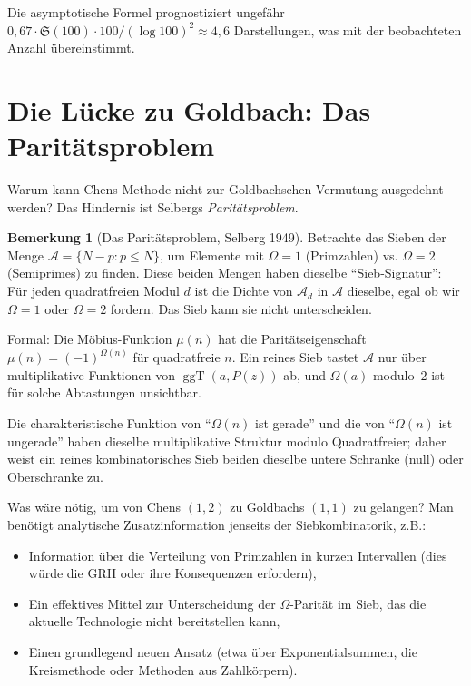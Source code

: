 \documentclass[12pt,a4paper]{amsart}
\theoremstyle{definition}
\newtheorem{bemerkung}[theorem]{Bemerkung}
\DeclareMathOperator{\ggT}{ggT}
\newcommand{\OOmega}{\Omega}
\begin{document}
Die asymptotische Formel prognostiziert ungefähr
$0{,}67 \cdot \mathfrak{S}(100) \cdot 100/(\log 100)^2 \approx 4{,}6$
Darstellungen, was mit der beobachteten Anzahl übereinstimmt.

\section{Die Lücke zu Goldbach: Das Paritätsproblem}\label{sec:paritaet}

Warum kann Chens Methode nicht zur Goldbachschen Vermutung ausgedehnt werden?
Das Hindernis ist Selbergs \emph{Paritätsproblem}.

\begin{bemerkung}[Das Paritätsproblem, Selberg 1949]
  Betrachte das Sieben der Menge $\mathcal{A} = \{N - p : p \leq N\}$,
  um Elemente mit $\OOmega = 1$ (Primzahlen) vs. $\OOmega = 2$ (Semiprimes)
  zu finden.  Diese beiden Mengen haben dieselbe ``Sieb-Signatur'': Für
  jeden quadratfreien Modul $d$ ist die Dichte von $\mathcal{A}_d$ in
  $\mathcal{A}$ dieselbe, egal ob wir $\OOmega = 1$ oder $\OOmega = 2$
  fordern.  Das Sieb kann sie nicht unterscheiden.

  Formal: Die Möbius-Funktion $\mu(n)$ hat die Paritätseigenschaft
  $\mu(n) = (-1)^{\OOmega(n)}$ für quadratfreie $n$.  Ein reines Sieb
  tastet $\mathcal{A}$ nur über multiplikative Funktionen von
  $\ggT(a, P(z))$ ab, und $\OOmega(a)$ modulo~$2$ ist für solche
  Abtastungen unsichtbar.

  Die charakteristische Funktion von ``$\OOmega(n)$ ist gerade'' und die
  von ``$\OOmega(n)$ ist ungerade'' haben dieselbe multiplikative Struktur
  modulo Quadratfreier; daher weist ein reines kombinatorisches Sieb beiden
  dieselbe untere Schranke (null) oder Oberschranke zu.
\end{bemerkung}

Was wäre nötig, um von Chens $(1,2)$ zu Goldbachs $(1,1)$ zu gelangen?
Man benötigt analytische Zusatzinformation jenseits der Siebkombinatorik,
z.B.:
\begin{itemize}
  \item Information über die Verteilung von Primzahlen in kurzen Intervallen
    (dies würde die GRH oder ihre Konsequenzen erfordern),
  \item Ein effektives Mittel zur Unterscheidung der $\OOmega$-Parität im
    Sieb, das die aktuelle Technologie nicht bereitstellen kann,
  \item Einen grundlegend neuen Ansatz (etwa über Exponentialsummen,
    die Kreismethode oder Methoden aus Zahlkörpern).
\end{itemize}
\end{document}
